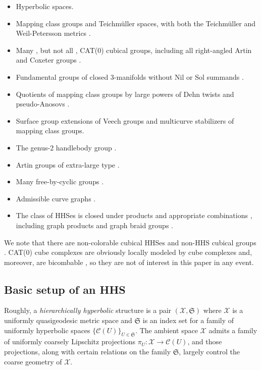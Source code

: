 \documentclass{amsart}
\theoremstyle{definition}
\theoremstyle{remark}
\theoremstyle{definition}
\newcommand{\calC}{\mathcal{C}}
\newcommand{\calX}{\mathcal{X}}
\begin{document}
\begin{itemize}
\item Hyperbolic spaces.
\item Mapping class groups \cite{MM99, MM00, Aougab_hyp, HHS_I} and Teichm\"uller spaces, with both the Teichm\"uller \cite{Rafi:combo, Dur:augmented} and Weil-Petersson metrics \cite{Brock}.
\item Many \cite{HS:cubical}, but not all \cite{shepherd2025cubulation}, CAT(0) cubical groups,  including all right-angled Artin and Coxeter groups \cite{HHS_I}.
\item Fundamental groups of closed 3-manifolds without Nil or Sol summands \cite{HHS_II, hagen2022equivariant}.
\item Quotients of mapping class groups by large powers of Dehn twists \cite{behrstock2024combinatorial} and pseudo-Anosovs \cite{HHS:asdim}.
\item Surface group extensions of Veech groups \cite{DDLS1, DDLS2, bongiovanni2024extensions} and multicurve stabilizers \cite{russell2021extensions} of mapping class groups.
\item  The genus-2 handlebody group \cite{chesser2022stable}.
\item Artin groups of extra-large type \cite{MMS:Artin}.
\item Many free-by-cyclic groups \cite{bongiovanni2025characterizing}.
\item Admissible curve graphs \cite{calderon2024hierarchical}.
\item The class of HHSes is closed under products and appropriate combinations \cite{HHS_II}, including graph products \cite{BR:graph_prods} and graph braid groups  \cite{berlyne2021hierarchical}.
\end{itemize}

We note that there are non-colorable cubical HHSes \cite{Hagen:non-col} and non-HHS cubical groups \cite{shepherd2025cubulation}.  CAT(0) cube complexes are obviously locally modeled by cube complexes and, moreover, are bicombable \cite{NibloReeves}, so they are not of interest in this paper in any event.

\subsection{Basic setup of an HHS}\label{subsec:basic HHS}

Roughly, a \emph{hierarchically hyperbolic} structure is a pair $(\calX, \mathfrak S)$ where $\calX$ is a uniformly quasigeodesic metric space and $\mathfrak S$ is an index set for a family of uniformly hyperbolic spaces $\{\calC(U)\}_{U \in \mathfrak S}$.  The ambient space $\calX$ admits a family of uniformly coarsely Lipschitz projections $\pi_U:\calX \to \calC(U)$, and those projections, along with certain relations on the family $\mathfrak S$, largely control the coarse geometry of $\calX$.
\end{document}
